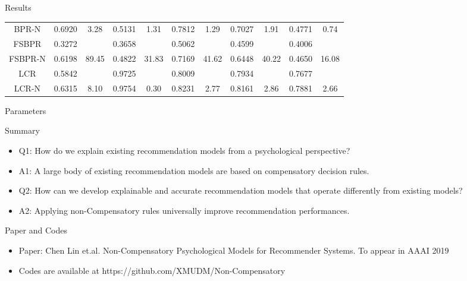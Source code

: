 \documentclass[xcolor=dvipsnames]{beamer}
\begin{document}
\begin{frame}{Results}
\begin{table}[ht]
{\begin{tabular}{c cc |cc |cc|cc|cc}
BPR-N	&0.6920	&3.28&	0.5131	&1.31&	0.7812&	1.29&	0.7027	&1.91&	0.4771	&0.74\\
FSBPR	&0.3272 	&&	0.3658 	&&	0.5062 	&&	0.4599 	&&	0.4006 	&\\
FSBPR-N	&0.6198 &	89.45&	0.4822 &	31.83&	0.7169& 	41.62&	0.6448 &	40.22&	0.4650 &	16.08\\
LCR	&0.5842 	&&	0.9725 	&&	0.8009 &&		0.7934 	&&	0.7677 	&\\
LCR-N&	0.6315 &	8.10&	0.9754 &	0.30&	0.8231 &	2.77&	0.8161 &	2.86&	0.7881 &	2.66	\\
\hline
\end{tabular}}
\label{tab:gradedresult}
\end{table}
\end{frame}
\begin{frame}{Parameters}
    
\begin{table}[htp]
\caption{AUC improvements with $\mathbf{b}$ activated, scale of parameters $\mathbf{b}_{u,k}$ and $\theta$.}
\small
\centering
{}
\label{tab:parameters}
\end{table}
\end{frame}
\begin{frame}{Summary}
        \begin{itemize}
        \item Q1: How do we explain existing recommendation models from a psychological perspective?
        \item \alert{A1: A large body of existing recommendation models are based on compensatory decision rules.}
        \item Q2: How can we develop explainable and accurate recommendation models that operate differently from existing models?
          \item \alert{A2: Applying non-Compensatory rules universally improve recommendation performances.}
    \end{itemize}
\end{frame}
\begin{frame}{Paper and Codes}
    \begin{itemize}
        \item Paper: Chen Lin et.al. Non-Compensatory Psychological Models for Recommender Systems. To appear in AAAI 2019
        \item Codes are available at https://github.com/XMUDM/Non-Compensatory
    \end{itemize}
\end{frame}

\end{document}
